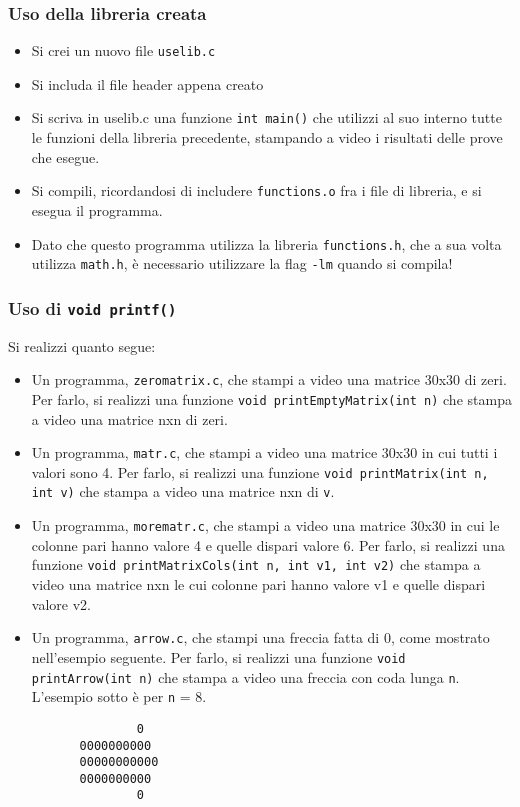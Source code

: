 \documentclass{beamer}
\begin{document}
\begin{frame}
\frametitle{Uso della libreria creata}
\begin{itemize}
 \item Si crei un nuovo file \texttt{uselib.c}
 \item Si includa il file header appena creato 
 \item Si scriva in uselib.c una funzione \texttt{int main()} che utilizzi al suo interno tutte le funzioni della libreria precedente, stampando a video i risultati delle prove che esegue.
 \item Si compili, ricordandosi di includere \texttt{functions.o} fra i file di libreria, e si esegua il programma.
 \item Dato che questo programma utilizza la libreria \texttt{functions.h}, che a sua volta utilizza \texttt{math.h}, è necessario utilizzare la flag \texttt{-lm} quando si compila!
\end{itemize}
\end{frame}

\begin{frame}[fragile]
\frametitle{Uso di \texttt{void printf()}}
Si realizzi quanto segue:
\scriptsize
\begin{itemize}
 \item Un programma, \texttt{zeromatrix.c}, che stampi a video una matrice 30x30 di zeri. Per farlo, si realizzi una funzione \texttt{void printEmptyMatrix(int n)} che stampa a video una matrice nxn di zeri.
 \item Un programma, \texttt{matr.c}, che stampi a video una matrice 30x30 in cui tutti i valori sono 4. Per farlo, si realizzi una funzione \texttt{void printMatrix(int n, int v)} che stampa a video una matrice nxn di \texttt{v}. 
 \item Un programma, \texttt{morematr.c}, che stampi a video una matrice 30x30 in cui le colonne pari hanno valore 4 e quelle dispari valore 6. Per farlo, si realizzi una funzione \texttt{void printMatrixCols(int n, int v1, int v2)} che stampa a video una matrice nxn le cui colonne pari hanno valore v1 e quelle dispari valore v2.
 \item Un programma, \texttt{arrow.c}, che stampi una freccia fatta di 0, come mostrato nell'esempio seguente. Per farlo, si realizzi una funzione \texttt{void printArrow(int n)} che stampa a video una freccia con coda lunga \texttt{n}. L'esempio sotto è per \texttt{n} = 8.
\end{itemize}
\begin{verbatim}
                  0
          0000000000
          00000000000
          0000000000
                  0
\end{verbatim}
\end{frame}
\end{document}
